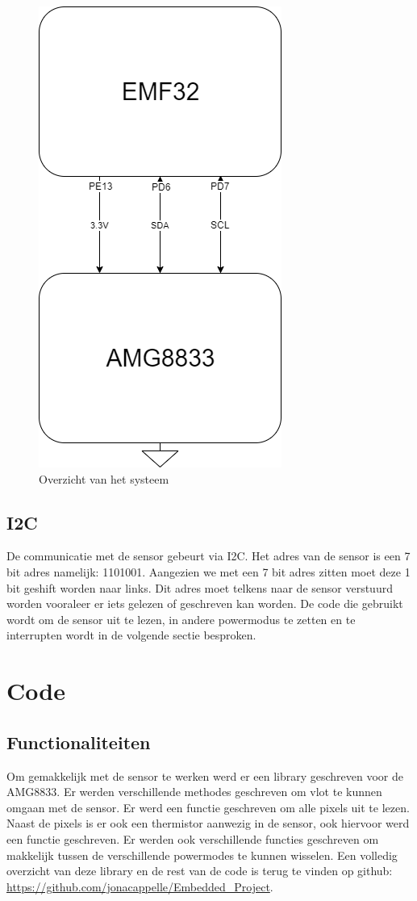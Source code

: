 \documentclass[]{article}
\begin{document}
\begin{figure}[!ht]
	\centering
	\includegraphics[scale=0.5]{sys1.png}
	\caption{Overzicht van het systeem}
	\label{fig:systeem}
\end{figure}
\subsection{I2C}
De communicatie met de sensor gebeurt via I2C. Het adres van de sensor is een 7 bit adres namelijk: 1101001. Aangezien we met een 7 bit adres zitten moet deze 1 bit geshift worden naar links. Dit adres moet telkens naar de sensor verstuurd worden vooraleer er iets gelezen of geschreven kan worden. De code die gebruikt wordt om de sensor uit te lezen, in andere powermodus te zetten en te interrupten wordt in de volgende sectie besproken. 


\section{Code}
\subsection{Functionaliteiten}
Om gemakkelijk met de sensor te werken werd er een library geschreven voor de AMG8833. Er werden verschillende methodes geschreven om vlot te kunnen omgaan met de sensor. Er werd een functie geschreven om alle pixels uit te lezen. Naast de pixels is er ook een thermistor aanwezig in de sensor, ook hiervoor werd een functie geschreven. Er werden ook verschillende functies geschreven om makkelijk tussen de verschillende powermodes te kunnen wisselen. Een volledig overzicht van deze library en de rest van de code is terug te vinden op github: \url{https://github.com/jonacappelle/Embedded_Project}.
\end{document}
